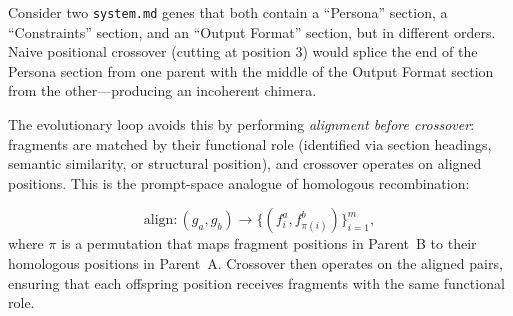 Consider two \texttt{system.md} genes that both contain a ``Persona'' section, a ``Constraints'' section, and an ``Output Format'' section, but in different orders. Naive positional crossover (cutting at position 3) would splice the end of the Persona section from one parent with the middle of the Output Format section from the other---producing an incoherent chimera.

The evolutionary loop avoids this by performing \emph{alignment before crossover}: fragments are matched by their functional role (identified via section headings, semantic similarity, or structural position), and crossover operates on aligned positions. This is the prompt-space analogue of homologous recombination:

\begin{equation}
\text{align}: (g_a, g_b) \to \bigl\{(f_i^a, f_{\pi(i)}^b)\bigr\}_{i=1}^{m},
\end{equation}
where $\pi$ is a permutation that maps fragment positions in Parent~B to their homologous positions in Parent~A. Crossover then operates on the aligned pairs, ensuring that each offspring position receives fragments with the same functional role.

